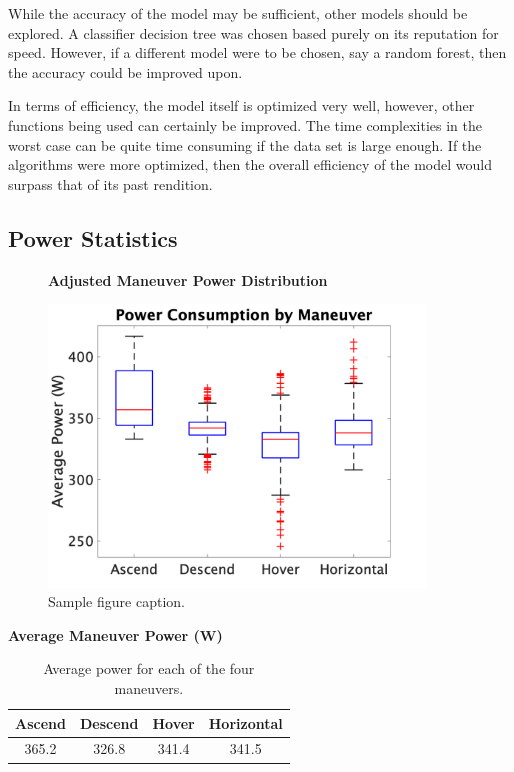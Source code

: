 \documentclass{article}
\begin{document}
While the accuracy of the model may be sufficient, other models should be explored. A classifier decision tree was chosen based purely on its reputation for speed. However, if a different model were to be chosen, say a random forest, then the accuracy could be improved upon.

In terms of efficiency, the model itself is optimized very well, however, other functions being used can certainly be improved. The time complexities in the worst case can be quite time consuming if the data set is large enough. If the algorithms were more optimized, then the overall efficiency of the model would surpass that of its past rendition.


\subsection{Power Statistics}
\begin{figure}
  \centering
  \large{\textbf{Adjusted Maneuver Power Distribution}}\par
  \includegraphics[width = 100mm]{images/powerfinal.png}
  \caption{Sample figure caption.}
  \label{fig:powerfinal}
\end{figure}


\begin{table}
  \centering
  \large{\textbf{Average Maneuver Power (W)}}\par\medskip
  \begin{tabular}{cccc}
    \toprule
    \cmidrule(r){1-2}
    Ascend     & Descend     & Hover & Horizontal \\
    \midrule
    365.2 & 326.8  & 341.4 & 341.5    \\
    \bottomrule
  \end{tabular} \bigskip
  \caption{Average power for each of the four maneuvers.}
  \label{tab:table}
\end{table}
\end{document}

